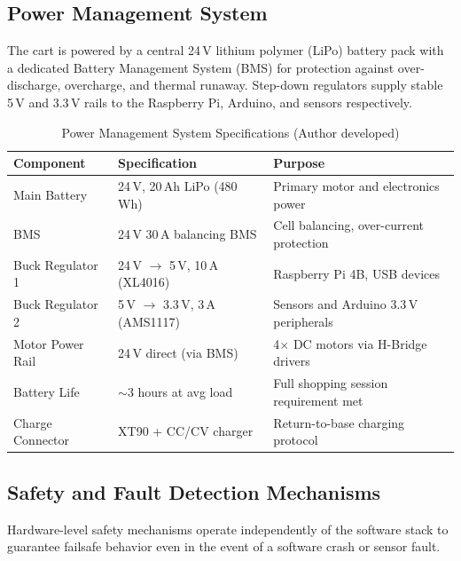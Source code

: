 \subsection{Power Management System}

The cart is powered by a central 24\,V lithium polymer (LiPo) battery
pack with a dedicated Battery Management System (BMS) for protection
against over-discharge, overcharge, and thermal runaway. Step-down
regulators supply stable 5\,V and 3.3\,V rails to the Raspberry Pi,
Arduino, and sensors respectively.

\begin{table}[!ht]
\caption{Power Management System Specifications (Author developed)}
\label{tab:power}
\centering
\footnotesize
\begin{tabular}{p{1.8cm} p{2.2cm} p{2.6cm}}
\toprule
\textbf{Component} & \textbf{Specification} & \textbf{Purpose} \\
\midrule
Main Battery & 24\,V, 20\,Ah LiPo (480\,Wh) & Primary motor and electronics power \\
BMS & 24\,V 30\,A balancing BMS & Cell balancing, over-current protection \\
Buck Regulator 1 & 24\,V $\to$ 5\,V, 10\,A (XL4016) & Raspberry Pi 4B, USB devices \\
Buck Regulator 2 & 5\,V $\to$ 3.3\,V, 3\,A (AMS1117) & Sensors and Arduino 3.3\,V peripherals \\
Motor Power Rail & 24\,V direct (via BMS) & 4$\times$ DC motors via H-Bridge drivers \\
Battery Life & $\sim$3 hours at avg load & Full shopping session requirement met \\
Charge Connector & XT90 + CC/CV charger & Return-to-base charging protocol \\
\bottomrule
\end{tabular}
\end{table}

\subsection{Safety and Fault Detection Mechanisms}

Hardware-level safety mechanisms operate independently of the software
stack to guarantee failsafe behavior even in the event of a software
crash or sensor fault.

